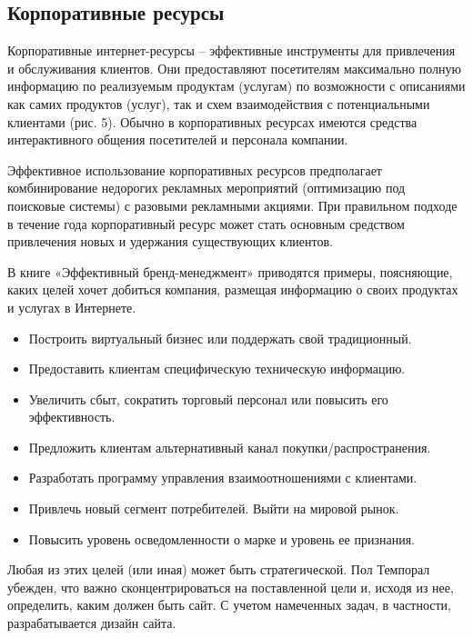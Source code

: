 \documentclass[a4paper,english,russian]{G2-105}
\begin{document}
\subsection{Корпоративные ресурсы}
\par Корпоративные интернет-ресурсы – эффективные инструменты для привлечения и обслуживания клиентов. Они предоставляют посетителям максимально полную информацию по реализуемым продуктам (услугам) по возможности с описаниями как самих продуктов (услуг), так и схем взаимодействия с потенциальными клиентами (рис. 5). Обычно в корпоративных ресурсах имеются средства интерактивного общения посетителей и персонала компании.
\par Эффективное использование корпоративных ресурсов предполагает комбинирование недорогих рекламных мероприятий (оптимизацию под поисковые системы) с разовыми рекламными акциями. При правильном подходе в течение года корпоративный ресурс может стать основным средством привлечения новых и удержания существующих клиентов.
\par В книге «Эффективный бренд-менеджмент» приводятся примеры, поясняющие, каких целей хочет добиться компания, размещая информацию о своих продуктах и услугах в Интернете.
\begin{itemize}
\item Построить виртуальный бизнес или поддержать свой традиционный.
\item Предоставить клиентам специфическую техническую информацию.
\item Увеличить сбыт, сократить торговый персонал или повысить его эффективность.
\item Предложить клиентам альтернативный канал покупки/распространения.
\item Разработать программу управления взаимоотношениями с клиентами.
\item Привлечь новый сегмент потребителей. Выйти на мировой рынок.
\item Повысить уровень осведомленности о марке и уровень ее признания.
\end{itemize}
\par Любая из этих целей (или иная) может быть стратегической. Пол Темпорал убежден, что важно сконцентрироваться на поставленной цели и, исходя из нее, определить, каким должен быть сайт. С учетом намеченных задач, в частности, разрабатывается дизайн сайта.
\end{document}

